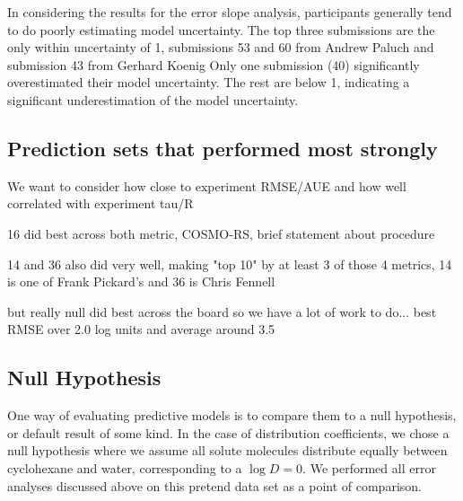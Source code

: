 In considering the results for the error slope analysis, participants generally tend to do poorly estimating model uncertainty. 
The top three submissions are the only within uncertainty of 1, submissions 53 and 60 from Andrew Paluch %
and submission 43 from Gerhard Koenig %
Only one submission (40) significantly overestimated their model uncertainty. 
The rest are below 1, indicating a significant underestimation of the model uncertainty. 


\subsection{Prediction sets that performed most strongly}
\label{results:2}
We want to consider how close to experiment RMSE/AUE and how well correlated with experiment tau/R

16 did best across both metric, COSMO-RS, brief statement about procedure

14 and 36 also did very well, making "top 10" by at least 3 of those 4 metrics, 14 is one of Frank Pickard's and 36 is Chris Fennell

but really null did best across the board so we have a lot of work to do... best RMSE over 2.0 log units and average around 3.5

\subsection{Null Hypothesis}
\label{results:3}
One way of evaluating predictive models is to compare them to a null hypothesis, or default result of some kind. 
In the case of distribution coefficients, we chose a null hypothesis where we assume all solute molecules distribute equally between cyclohexane and water, corresponding to a $\log D = 0$. 
We performed all error analyses discussed above on this pretend data set as a point of comparison. 


